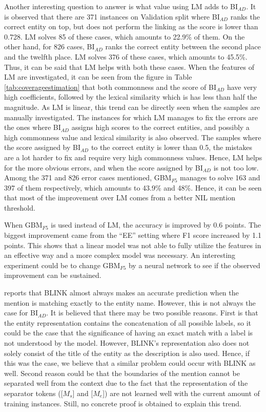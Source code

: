\documentclass{report}
\theoremstyle{definition}
\theoremstyle{remark}
\begin{document}
Another interesting question to answer is what value using LM adds to BI$_{AD}$. It is observed that there are 371 instances on Validation split where BI$_{AD}$ ranks the correct entity on top, but does not perform the linking as the score is lower than 0.728. LM solves 85 of these cases, which amounts to 22.9\% of them. On the other hand, for 826 cases, BI$_{AD}$ ranks the correct entity between the second place and the twelfth place. LM solves 376 of these cases, which amounts to 45.5\%. Thus, it can be said that LM helps with both these cases. When the features of LM are investigated, it can be seen from the figure in Table \ref{tab:coverageestimation} that both commonness and the score of BI$_{AD}$ have very high coefficients, followed by the lexical similarity which is has less than half the magnitude. As LM is linear, this trend can be directly seen when the samples are manually investigated. The instances for which LM manages to fix the errors are the ones where BI$_{AD}$ assigns high scores to the correct entities, and possibly a high commonness value and lexical similarity is also observed. The samples where the score assigned by BI$_{AD}$ to the correct entity is lower than 0.5, the mistakes are a lot harder to fix and require very high commonness values. Hence, LM helps for the more obvious errors, and when the score assigned by BI$_{AD}$ is not too low. Among the 371 and 826 error cases mentioned, GBM$_{F5}$ manages to solve 163 and 397 of them respectively, which amounts to 43.9\% and 48\%. Hence, it can be seen that most of the improvement over LM comes from a better NIL mention threshold.

When GBM$_{F5}$ is used instead of LM, the accuracy is improved by 0.6 points. The biggest improvement came from the ``EE'' setting where F1 score increased by 1.1 points. This shows that a linear model was not able to fully utilize the features in an effective way and a more complex model was necessary. An interesting experiment could be to change GBM$_{F5}$ by a neural network to see if the observed improvement can be sustained.

\cite{GENRE} reports that BLINK almost always makes an accurate prediction when the mention is matching exactly to the entity name. However, this is not always the case for BI$_{AD}$. It is believed that there may be two possible reasons. First is that the entity representation contains the concatenation of all possible labels, so it could be the case that the significance of having an exact match with a label is not understood by the model. However, BLINK's representation also does not solely consist of the title of the entity as the description is also used. Hence, if this was the case, we believe that a similar problem could occur with BLINK as well. Second reason could be that the boundaries of the mention cannot be separated well from the context due to the fact that the representation of the separator tokens ([$M_s$] and [$M_e$]) are not learned well with the current amount of training instances. Still, no concrete proof is obtained to explain this trend.
\end{document}

